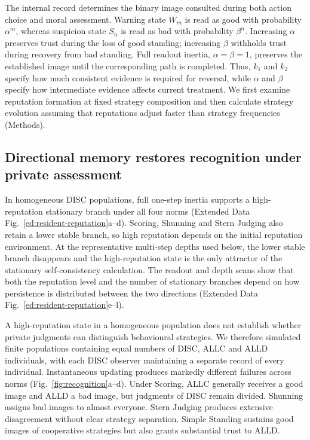 \documentclass[fleqn,10pt]{article}
\begin{document}
The internal record determines the binary image consulted during both action choice and moral assessment. Warning state $W_m$ is read as good with probability $\alpha^m$, whereas suspicion state $S_n$ is read as bad with probability $\beta^n$. Increasing $\alpha$ preserves trust during the loss of good standing; increasing $\beta$ withholds trust during recovery from bad standing. Full readout inertia, $\alpha=\beta=1$, preserves the established image until the corresponding path is completed. Thus, $k_1$ and $k_2$ specify how much consistent evidence is required for reversal, while $\alpha$ and $\beta$ specify how intermediate evidence affects current treatment. We first examine reputation formation at fixed strategy composition and then calculate strategy evolution assuming that reputations adjust faster than strategy frequencies (Methods).

\subsection*{Directional memory restores recognition under private assessment}

In homogeneous DISC populations, full one-step inertia supports a high-reputation stationary branch under all four norms (Extended Data Fig.~\ref{ed:resident-reputation}a--d). Scoring, Shunning and Stern Judging also retain a lower stable branch, so high reputation depends on the initial reputation environment. At the representative multi-step depths used below, the lower stable branch disappears and the high-reputation state is the only attractor of the stationary self-consistency calculation. The readout and depth scans show that both the reputation level and the number of stationary branches depend on how persistence is distributed between the two directions (Extended Data Fig.~\ref{ed:resident-reputation}e--l).

A high-reputation state in a homogeneous population does not establish whether private judgments can distinguish behavioural strategies. We therefore simulated finite populations containing equal numbers of DISC, ALLC and ALLD individuals, with each DISC observer maintaining a separate record of every individual. Instantaneous updating produces markedly different failures across norms (Fig.~\ref{fig:recognition}a--d). Under Scoring, ALLC generally receives a good image and ALLD a bad image, but judgments of DISC remain divided. Shunning assigns bad images to almost everyone. Stern Judging produces extensive disagreement without clear strategy separation. Simple Standing sustains good images of cooperative strategies but also grants substantial trust to ALLD.
\end{document}
